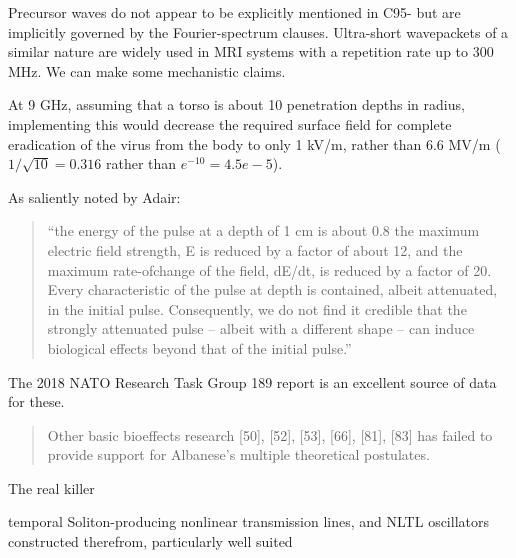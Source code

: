 \documentclass[paper.tex]{subfiles}
\begin{document}
Precursor waves do not appear to be explicitly mentioned in C95- but are implicitly governed by the Fourier-spectrum clauses. Ultra-short wavepackets of a similar nature are widely used in MRI systems with a repetition rate up to 300 MHz. We can make some mechanistic claims.

At 9 GHz, assuming that a torso is about 10 penetration depths in radius, implementing this would decrease the required surface field for complete eradication of the virus from the body to only 1 kV/m, rather than 6.6 MV/m ($1/\sqrt{10}=0.316$ rather than $e^{-10}=4.5e-5$). 


As saliently noted by Adair:

\begin{quote}
	“the energy of the pulse at a depth of 1 cm is about 0.8%
	the maximum electric field strength, E is reduced by a factor of about 12, and the maximum rate-ofchange of the field, dE/dt, is reduced by a factor of 20. Every characteristic of the pulse at depth is
	contained, albeit attenuated, in the initial pulse. Consequently, we do not find it credible that the
	strongly attenuated pulse – albeit with a different shape – can induce biological effects beyond that of
	the initial pulse.”
\end{quote}


The 2018 NATO Research Task Group 189 report \cite{treatyelectromagnetic} is an excellent source of data for these. 

\begin{quote}
	Other basic bioeffects research [50], [52], [53], [66], [81], [83] has failed to provide support for Albanese’s multiple	theoretical postulates.
\end{quote}

The real killer 





temporal Soliton-producing nonlinear transmission lines, and NLTL oscillators constructed therefrom, particularly well suited 
\end{document}
